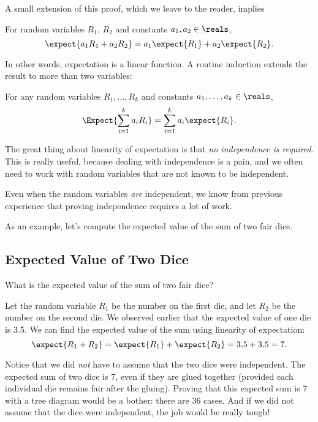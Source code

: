 A small extension of this proof, which we leave to the reader, implies
\begin{theorem}
For random variables $R_1$, $R_2$ and constants $a_1,a_2 \in \reals$,
\[
\expect{a_1R_1 + a_2R_2} = a_1\expect{R_1} + a_2\expect{R_2}.
\]
\end{theorem}
In other words, expectation is a linear function.  A routine induction
extends the result to more than two variables:
\begin{corollary}\label{linexp-k-thm}
For any random variables $R_1, \dots, R_k$ and constants $a_1, \dots, a_k
\in \reals$,
\[
\Expect{\sum_{i=1}^k a_iR_i} = \sum_{i=1}^k a_i\expect{R_i}.
\]
\end{corollary}

The great thing about linearity of expectation is that \emph{no
independence is required}.  This is really useful, because dealing with
independence is a pain, and we often need to work with random variables
that are not known to be independent.

\begin{editingnotes}
Even when the random variables \emph{are} independent, we know
from previous experience that proving independence requires a lot of
work.
\end{editingnotes}

As an example, let's compute the expected value of the sum of two fair
dice.

\subsection{Expected Value of Two Dice}

What is the expected value of the sum of two fair dice?

Let the random variable $R_1$ be the number on the first die, and let
$R_2$ be the number on the second die.  We observed earlier that the
expected value of one die is 3.5.  We can find the expected value of the
sum using linearity of expectation:
\begin{equation*}
\expect{R_1 + R_2} 
 =   \expect{R_1} + \expect{R_2}
 =    3.5 + 3.5
 =    7.
\end{equation*}

Notice that we did \emph{not} have to assume that the two dice were
independent.  The expected sum of two dice is 7, even if they are
glued together (provided each individual die remains fair after the
gluing).  Proving that this expected sum is 7 with a tree diagram
would be a bother: there are 36 cases.  And if we did not assume that
the dice were independent, the job would be really tough!

